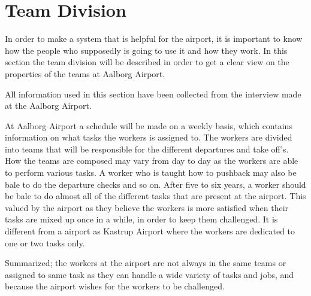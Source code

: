 \section{Team Division}
In order to make a system that is helpful for the airport, it is important to know how the people who supposedly is going to use it and how they work. In this section the team division will be described in order to get a clear view on the properties of the teams at Aalborg Airport.

All information used in this section have been collected from the interview made at the Aalborg Airport.



At Aalborg Airport a schedule will be made on a weekly basis, which contains information on what tasks the workers is assigned to. The workers are divided into teams that will be responsible for the different departures and take off's. How the teams are composed may vary from day to day as the workers are able to perform various tasks. A worker who is taught how to pushback may also be bale to do the departure checks and so on. After five to six years, a worker should be bale to do almost all of the different tasks that are present at the airport. This valued by the airport as they believe the workers is more satisfied when their tasks are mixed up once in a while, in order to keep them challenged. It is different from a airport as Kastrup Airport where the workers are dedicated to one or two tasks only.  


Summarized; the workers at the airport are not always in the same teams or assigned to same task as they can handle a wide variety of tasks and jobs, and because the airport wishes for the workers to be challenged.